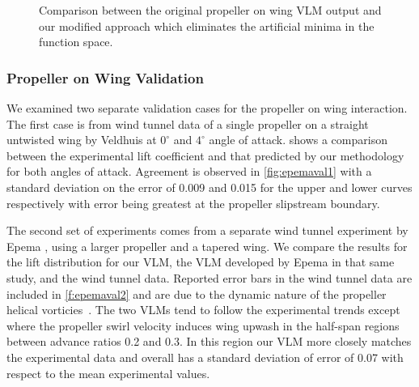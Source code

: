 \documentclass[conf]{new-aiaa}
\begin{document}
\begin{figure}[htbp]
    \centering
    \qquad
    \caption{Comparison between the original propeller on wing VLM output and our modified approach which eliminates the artificial minima in the function space.}
    \label{fig:smoothvlm}
\end{figure}

\subsubsection{Propeller on Wing Validation}

We examined two separate validation cases for the propeller on wing interaction. The first case is from wind tunnel data of a single propeller on a straight untwisted wing by Veldhuis \cite{Veldhuis2004,proponwing} at $0^\circ$ and $4^\circ$ angle of attack.  shows a comparison between the experimental lift coefficient and that predicted by our methodology for both angles of attack. Agreement is observed in \cref{fig:epemaval1} with a standard deviation on the error of 0.009 and 0.015 for the upper and lower curves respectively with error being greatest at the propeller slipstream boundary.

The second set of experiments comes from a separate wind tunnel experiment by Epema \cite{epema}, using a larger propeller and a tapered wing. We compare the results for the lift distribution for our VLM, the VLM developed by Epema in that same study, and the wind tunnel data. Reported error bars in the wind tunnel data are included in \cref{f:epemaval2} and are due to the dynamic nature of the propeller helical vorticies~\cite{Alvarez:2018aa}. The two VLMs tend to follow the experimental trends except where the propeller swirl velocity induces wing upwash in the half-span regions between advance ratios 0.2 and 0.3. In this region our VLM more closely matches the experimental data and overall has a standard deviation of error of 0.07 with respect to the mean experimental values.
\end{document}
